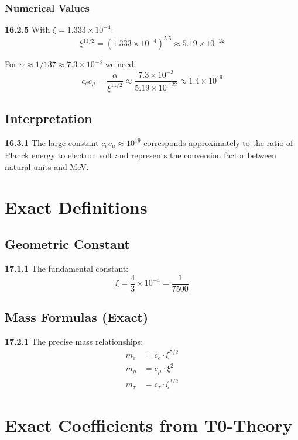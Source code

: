 \documentclass[12pt,a4paper]{article}
\newcommand{\xipar}{\xi}
\begin{document}
\subsubsection{Numerical Values}
\noindent \textbf{16.2.5} With $\xipar = 1.333 \times 10^{-4}$:
\begin{equation}
	\xipar^{11/2} = (1.333 \times 10^{-4})^{5.5} \approx 5.19 \times 10^{-22}
\end{equation}

For $\alpha \approx 1/137 \approx 7.3 \times 10^{-3}$ we need:
\begin{equation}
	c_e c_\mu = \frac{\alpha}{\xipar^{11/2}} \approx \frac{7.3 \times 10^{-3}}{5.19 \times 10^{-22}} \approx 1.4 \times 10^{19}
\end{equation}

\subsection{Interpretation}
\noindent \textbf{16.3.1} The large constant $c_e c_\mu \approx 10^{19}$ corresponds approximately to the ratio of Planck energy to electron volt and represents the conversion factor between natural units and MeV.

\section{Exact Definitions}

\subsection{Geometric Constant}
\noindent \textbf{17.1.1} The fundamental constant:
\begin{equation}
	\xi = \frac{4}{3} \times 10^{-4} = \frac{1}{7500}
\end{equation}

\subsection{Mass Formulas (Exact)}
\noindent \textbf{17.2.1} The precise mass relationships:
\begin{align}
	m_e &= c_e \cdot \xi^{5/2} \\
	m_\mu &= c_\mu \cdot \xi^2 \\
	m_\tau &= c_\tau \cdot \xi^{3/2}
\end{align}

\section{Exact Coefficients from T0-Theory}
\end{document}
